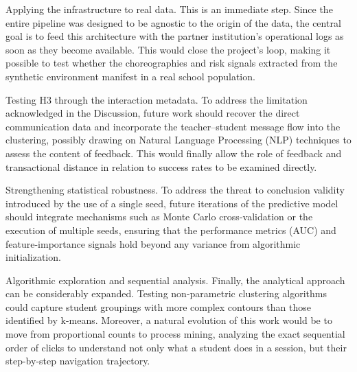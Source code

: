 Applying the infrastructure to real data. This is an immediate step. Since the entire pipeline was designed to be agnostic to the origin of the data, the central goal is to feed this architecture with the partner institution's operational logs as soon as they become available. This would close the project's loop, making it possible to test whether the choreographies and risk signals extracted from the synthetic environment manifest in a real school population.

Testing H3 through the interaction metadata. To address the limitation acknowledged in the Discussion, future work should recover the direct communication data and incorporate the teacher--student message flow into the clustering, possibly drawing on Natural Language Processing (NLP) techniques to assess the content of feedback. This would finally allow the role of feedback and transactional distance in relation to success rates to be examined directly.

Strengthening statistical robustness. To address the threat to conclusion validity introduced by the use of a single seed, future iterations of the predictive model should integrate mechanisms such as Monte Carlo cross-validation or the execution of multiple seeds, ensuring that the performance metrics (AUC) and feature-importance signals hold beyond any variance from algorithmic initialization.

Algorithmic exploration and sequential analysis. Finally, the analytical approach can be considerably expanded. Testing non-parametric clustering algorithms could capture student groupings with more complex contours than those identified by k-means. Moreover, a natural evolution of this work would be to move from proportional counts to process mining, analyzing the exact sequential order of clicks to understand not only what a student does in a session, but their step-by-step navigation trajectory.